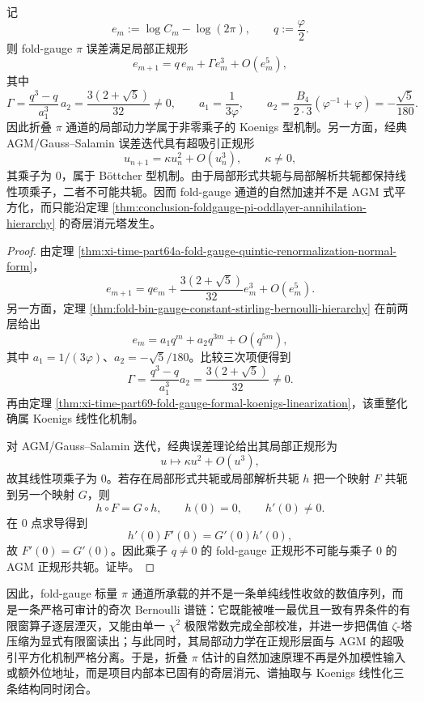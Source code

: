 \begin{theorem}\label{thm:conclusion-foldgauge-pi-koenigs-vs-agm-nonconjugacy}
记
\[
e_m:=\log C_m-\log(2\pi),
\qquad
q:=\frac{\varphi}{2}.
\]
则 fold-gauge \(\pi\) 误差满足局部正规形
\[
e_{m+1}
=
q\,e_m+\Gamma e_m^3+O(e_m^5),
\]
其中
\[
\Gamma
=
\frac{q^3-q}{a_1^3}\,a_2
=
\frac{3(2+\sqrt5)}{32}\neq 0,
\qquad
a_1=\frac{1}{3\varphi},
\qquad
a_2=\frac{B_4}{2\cdot 3}(\varphi^{-1}+\varphi)
=
-\frac{\sqrt5}{180}.
\]
因此折叠 \(\pi\) 通道的局部动力学属于非零乘子的 Koenigs 型机制。另一方面，经典 AGM/Gauss--Salamin 误差迭代具有超吸引正规形
\[
u_{n+1}=\kappa u_n^2+O(u_n^3),
\qquad
\kappa\neq 0,
\]
其乘子为 \(0\)，属于 B\"ottcher 型机制。由于局部形式共轭与局部解析共轭都保持线性项乘子，二者不可能共轭。因而 fold-gauge 通道的自然加速并不是 AGM 式平方化，而只能沿定理 \ref{thm:conclusion-foldgauge-pi-oddlayer-annihilation-hierarchy} 的奇层消元塔发生。
\end{theorem}
\begin{proof}
由定理 \ref{thm:xi-time-part64a-fold-gauge-quintic-renormalization-normal-form}，
\[
e_{m+1}
=
q e_m+\frac{3(2+\sqrt5)}{32}e_m^3+O(e_m^5).
\]
另一方面，定理 \ref{thm:fold-bin-gauge-constant-stirling-bernoulli-hierarchy} 在前两层给出
\[
e_m=a_1q^m+a_2q^{3m}+O(q^{5m}),
\]
其中 \(a_1=1/(3\varphi)\)、\(a_2=-\sqrt5/180\)。比较三次项便得到
\[
\Gamma=\frac{q^3-q}{a_1^3}a_2=\frac{3(2+\sqrt5)}{32}\neq 0.
\]
再由定理 \ref{thm:xi-time-part69-fold-gauge-formal-koenigs-linearization}，该重整化确属 Koenigs 线性化机制。

对 AGM/Gauss--Salamin 迭代，经典误差理论给出其局部正规形为
\[
u\longmapsto \kappa u^2+O(u^3),
\]
故其线性项乘子为 \(0\)。若存在局部形式共轭或局部解析共轭 \(h\) 把一个映射 \(F\) 共轭到另一个映射 \(G\)，则
\[
h\circ F=G\circ h,
\qquad
h(0)=0,
\qquad
h'(0)\neq 0.
\]
在 \(0\) 点求导得到
\[
h'(0)F'(0)=G'(0)h'(0),
\]
故 \(F'(0)=G'(0)\)。因此乘子 \(q\neq 0\) 的 fold-gauge 正规形不可能与乘子 \(0\) 的 AGM 正规形共轭。证毕。
\end{proof}

\noindent
因此，fold-gauge 标量 \(\pi\) 通道所承载的并不是一条单纯线性收敛的数值序列，而是一条严格可审计的奇次 Bernoulli 谱链：它既能被唯一最优且一致有界条件的有限窗算子逐层湮灭，又能由单一 \(\chi^2\) 极限常数完成全部校准，并进一步把偶值 \(\zeta\)-塔压缩为显式有限窗读出；与此同时，其局部动力学在正规形层面与 AGM 的超吸引平方化机制严格分离。于是，折叠 \(\pi\) 估计的自然加速原理不再是外加模性输入或额外位地址，而是项目内部本已固有的奇层消元、谱抽取与 Koenigs 线性化三条结构同时闭合。

\endinput
